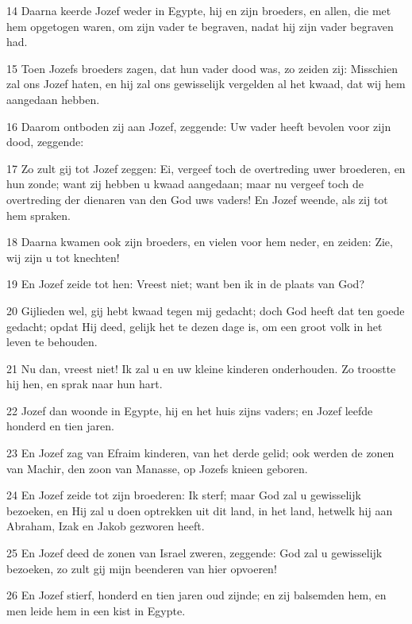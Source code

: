 \par 14 Daarna keerde Jozef weder in Egypte, hij en zijn broeders, en allen, die met hem opgetogen waren, om zijn vader te begraven, nadat hij zijn vader begraven had.
\par 15 Toen Jozefs broeders zagen, dat hun vader dood was, zo zeiden zij: Misschien zal ons Jozef haten, en hij zal ons gewisselijk vergelden al het kwaad, dat wij hem aangedaan hebben.
\par 16 Daarom ontboden zij aan Jozef, zeggende: Uw vader heeft bevolen voor zijn dood, zeggende:
\par 17 Zo zult gij tot Jozef zeggen: Ei, vergeef toch de overtreding uwer broederen, en hun zonde; want zij hebben u kwaad aangedaan; maar nu vergeef toch de overtreding der dienaren van den God uws vaders! En Jozef weende, als zij tot hem spraken.
\par 18 Daarna kwamen ook zijn broeders, en vielen voor hem neder, en zeiden: Zie, wij zijn u tot knechten!
\par 19 En Jozef zeide tot hen: Vreest niet; want ben ik in de plaats van God?
\par 20 Gijlieden wel, gij hebt kwaad tegen mij gedacht; doch God heeft dat ten goede gedacht; opdat Hij deed, gelijk het te dezen dage is, om een groot volk in het leven te behouden.
\par 21 Nu dan, vreest niet! Ik zal u en uw kleine kinderen onderhouden. Zo troostte hij hen, en sprak naar hun hart.
\par 22 Jozef dan woonde in Egypte, hij en het huis zijns vaders; en Jozef leefde honderd en tien jaren.
\par 23 En Jozef zag van Efraim kinderen, van het derde gelid; ook werden de zonen van Machir, den zoon van Manasse, op Jozefs knieen geboren.
\par 24 En Jozef zeide tot zijn broederen: Ik sterf; maar God zal u gewisselijk bezoeken, en Hij zal u doen optrekken uit dit land, in het land, hetwelk hij aan Abraham, Izak en Jakob gezworen heeft.
\par 25 En Jozef deed de zonen van Israel zweren, zeggende: God zal u gewisselijk bezoeken, zo zult gij mijn beenderen van hier opvoeren!
\par 26 En Jozef stierf, honderd en tien jaren oud zijnde; en zij balsemden hem, en men leide hem in een kist in Egypte.



